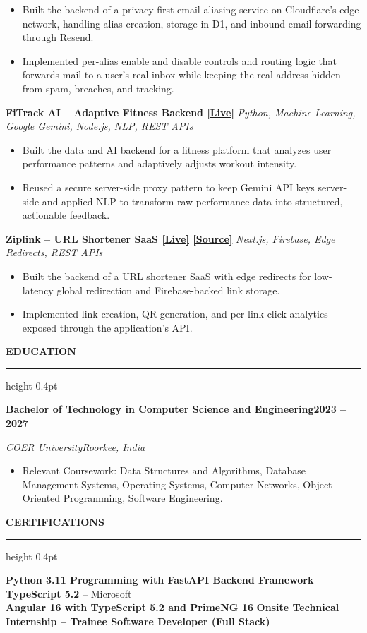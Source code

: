 \documentclass[10pt,a4paper]{article}
\newcommand{\resumeSection}[1]{%
  \vspace{5pt}
  {\normalsize\bfseries\color{heading} #1}\par
  \vspace{1pt}
  {\color{rulecolor}\hrule height 0.4pt}
  \vspace{3pt}
}
\newcommand{\resumeSubheading}[4]{%
  \textbf{#1}\hfill\textbf{#2}\par
  \textit{#3}\hfill\textit{#4}\par
  \vspace{-0.15em}
}
\newcommand{\projectHeading}[2]{%
  \textbf{#1} \textbar{} \textit{#2}\par
  \vspace{-0.15em}
}
\begin{document}
\begin{itemize}
  \item Built the backend of a privacy-first email aliasing service on
  Cloudflare's edge network, handling alias creation, storage in D1, and
  inbound email forwarding through Resend.

  \item Implemented per-alias enable and disable controls and routing logic
  that forwards mail to a user's real inbox while keeping the real address
  hidden from spam, breaches, and tracking.
\end{itemize}

\projectHeading
{FiTrack AI -- Adaptive Fitness Backend \href{https://fitrack-ai.ash-labs.tech/}{[Live]}}
{Python, Machine Learning, Google Gemini, Node.js, NLP, REST APIs}

\begin{itemize}
  \item Built the data and AI backend for a fitness platform that analyzes
  user performance patterns and adaptively adjusts workout intensity.

  \item Reused a secure server-side proxy pattern to keep Gemini API keys
  server-side and applied NLP to transform raw performance data into
  structured, actionable feedback.
\end{itemize}

\projectHeading
{Ziplink -- URL Shortener SaaS \href{https://ziplink.ash-labs.tech}{[Live]} \href{https://github.com/Tech-aficionado/ZipLink---Open-Source}{[Source]}}
{Next.js, Firebase, Edge Redirects, REST APIs}

\begin{itemize}
  \item Built the backend of a URL shortener SaaS with edge redirects for
  low-latency global redirection and Firebase-backed link storage.

  \item Implemented link creation, QR generation, and per-link click
  analytics exposed through the application's API.
\end{itemize}

\resumeSection{EDUCATION}

\resumeSubheading
{Bachelor of Technology in Computer Science and Engineering}
{2023 -- 2027}
{COER University}
{Roorkee, India}

\begin{itemize}
  \item Relevant Coursework: Data Structures and Algorithms, Database
  Management Systems, Operating Systems, Computer Networks,
  Object-Oriented Programming, Software Engineering.
\end{itemize}

\resumeSection{CERTIFICATIONS}

{\small
\textbf{Python 3.11 Programming with FastAPI Backend Framework}
\quad \textbar{} \quad
\textbf{TypeScript 5.2} -- Microsoft
\\[2pt]
\textbf{Angular 16 with TypeScript 5.2 and PrimeNG 16}
\quad \textbar{} \quad
\textbf{Onsite Technical Internship -- Trainee Software Developer (Full Stack)}
}
\end{document}
